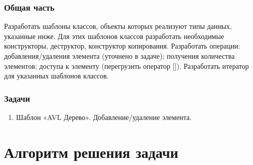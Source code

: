\documentclass[a4paper,12pt]{article}
\begin{document}
\subsubsection*{Общая часть}
Разработать шаблоны классов, объекты которых реализуют типы данных, указанные ниже. Для
этих шаблонов классов разработать необходимые конструкторы, деструктор, конструктор копирования. Разработать операции: добавления/удаления элемента (уточнено в задаче); получения количества элементов; доступа к элементу (перегрузить оператор []). Разработать итератор для указанных шаблонов классов.

\subsubsection*{Задачи}
\begin{enumerate}
\item Шаблон «AVL Дерево». Добавление/удаление элемента.
\end{enumerate}

\cleardoublepage
\section{Алгоритм решения задачи}
\end{document}
